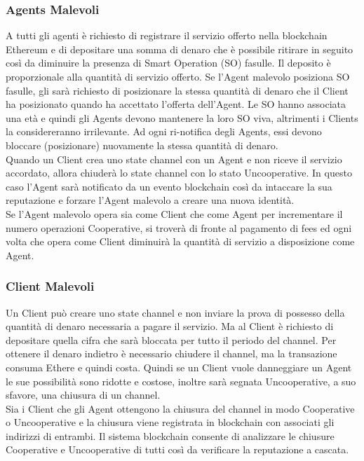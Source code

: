 \documentclass[]{article}
\begin{document}
	\subsubsection{Agents Malevoli}	
	A tutti gli agenti è richiesto di registrare il servizio offerto nella blockchain Ethereum e di depositare una somma di denaro che è possibile ritirare in seguito così da diminuire la presenza di Smart Operation (SO) fasulle. Il deposito è proporzionale alla quantità di servizio offerto.
	Se l’Agent malevolo posiziona SO fasulle, gli sarà richiesto di posizionare la stessa quantità di denaro che il Client ha posizionato quando ha accettato l’offerta dell’Agent.
	Le SO hanno associata una età e quindi gli Agents devono mantenere la loro SO viva, altrimenti i Clients la considereranno irrilevante.
	Ad ogni ri-notifica degli Agents, essi devono bloccare (posizionare) nuovamente la stessa quantità di denaro.\\	
	Quando un Client crea uno state channel con un Agent e non riceve il servizio accordato, allora chiuderà lo state channel con lo stato Uncooperative. In questo caso l’Agent sarà notificato da un evento blockchain così da intaccare la sua reputazione e forzare l’Agent malevolo a creare una nuova identità.\\	
	Se l’Agent malevolo opera sia come Client che come Agent per incrementare il numero operazioni Cooperative, si troverà di fronte al pagamento di fees ed ogni volta che opera come Client diminuirà la quantità di servizio a disposizione come Agent.	
	\subsubsection{Client Malevoli}	
	Un Client può creare uno state channel e non inviare la prova di possesso della quantità di denaro necessaria a pagare il servizio. Ma al Client è richiesto di depositare quella cifra che sarà bloccata per tutto il periodo del channel. Per ottenere il denaro indietro è necessario chiudere il channel, ma la transazione consuma Ethere e quindi costa.
	Quindi se un Client vuole danneggiare un Agent le sue possibilità sono ridotte e costose, inoltre sarà segnata Uncooperative, a suo sfavore, una chiusura di un channel.\\	
	Sia i Client che gli Agent ottengono la chiusura del channel in modo Cooperative o Uncooperative e la chiusura viene registrata in blockchain con associati gli indirizzi di entrambi.
	Il sistema blockchain consente di analizzare le chiusure Cooperative e Uncooperative di tutti così da verificare la reputazione a cascata.	
\end{document}
